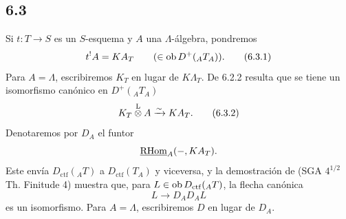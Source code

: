 \subsection*{6.3}
Si $t:T\to S$ es un $S$-esquema y $A$ una $\Lambda$-álgebra, pondremos
\begin{equation}
t^!A = KA_T \qquad(\in\operatorname{ob} D^+({}_AT_A)).
\tag{6.3.1}
\end{equation}
Para $A=\Lambda$, escribiremos $K_T$ en lugar de $K\Lambda_T$. De 6.2.2 resulta que se tiene un isomorfismo canónico en $D^+({}_AT_A)$
\begin{equation}
K_T\overset{\mathrm L}{\otimes} A\xrightarrow{\sim}KA_T.
\tag{6.3.2}
\end{equation}
Denotaremos por $D_A$ el funtor
\[
\underline{\mathrm{RHom}}_A(-,KA_T).
\]
Este envía $D_{\mathrm{ctf}}({}_AT)$ a $D_{\mathrm{ctf}}(T_A)$ y viceversa, y la demostración de (SGA $4^{1/2}$ Th. Finitude 4) muestra que, para $L\in\operatorname{ob} D_{\mathrm{ctf}}({}_AT)$, la flecha canónica
\[
L\longrightarrow D_AD_AL
\]
es un isomorfismo. Para $A=\Lambda$, escribiremos $D$ en lugar de $D_A$.
